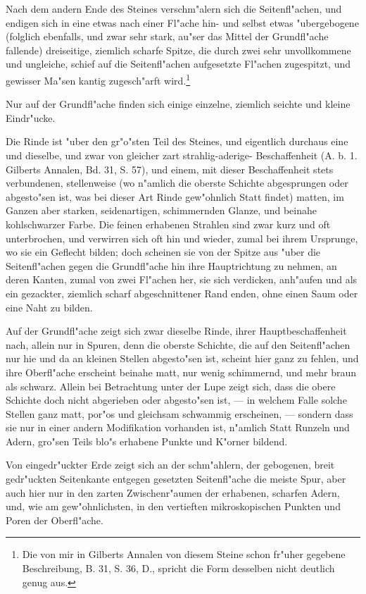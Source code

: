 \documentclass[a4paper, 11pt, oneside, german]{article}
\begin{document}
Nach dem andern Ende des Steines verschm"alern sich die Seitenfl"achen, und endigen sich in eine etwas nach einer Fl"ache hin- und selbst etwas "ubergebogene (folglich ebenfalls, und zwar sehr stark, au"ser das Mittel der Grundfl"ache fallende) dreiseitige, ziemlich scharfe Spitze, die durch zwei sehr unvollkommene und ungleiche, schief auf die Seitenfl"achen aufgesetzte Fl"achen zugespitzt, und gewisser Ma"sen kantig zugesch"arft wird.\footnote{Die von mir in Gilberts Annalen von diesem Steine schon fr"uher gegebene Beschreibung, B. 31, S. 36, D., spricht die Form desselben nicht deutlich genug aus.}

Nur auf der Grundfl"ache finden sich einige einzelne, ziemlich seichte und kleine Eindr"ucke.

Die Rinde ist "uber den gr"o"sten Teil des Steines, und eigentlich durchaus eine und dieselbe, und zwar von gleicher zart strahlig-aderige- Beschaffenheit (A. b. 1. Gilberts Annalen, Bd. 31, S. 57), und einem, mit dieser Beschaffenheit stets verbundenen, stellenweise (wo n"amlich die oberste Schichte abgesprungen oder abgesto"sen ist, was bei dieser Art Rinde gew"ohnlich Statt findet) matten, im Ganzen aber starken, seidenartigen, schimmernden Glanze, und beinahe kohlschwarzer Farbe. Die feinen erhabenen Strahlen sind zwar kurz und oft unterbrochen, und verwirren sich oft hin und wieder, zumal bei ihrem Ursprunge, wo sie ein Geflecht bilden; doch scheinen sie von der Spitze aus "uber die Seitenfl"achen gegen die Grundfl"ache hin ihre Hauptrichtung zu nehmen, an deren Kanten, zumal von zwei Fl"achen her, sie sich verdicken, anh"aufen und als ein gezackter, ziemlich scharf abgeschnittener Rand enden, ohne einen Saum oder eine Naht zu bilden.

Auf der Grundfl"ache zeigt sich zwar dieselbe Rinde, ihrer Hauptbeschaffenheit nach, allein nur in Spuren, denn die oberste Schichte, die auf den Seitenfl"achen nur hie und da an kleinen Stellen abgesto"sen ist, scheint hier ganz zu fehlen, und ihre Oberfl"ache erscheint beinahe matt, nur wenig schimmernd, und mehr braun als schwarz. Allein bei Betrachtung unter der Lupe zeigt sich, dass die obere Schichte doch nicht abgerieben oder abgesto"sen ist, --- in welchem Falle solche Stellen ganz matt, por"os und gleichsam schwammig erscheinen, --- sondern dass sie nur in einer andern Modifikation vorhanden ist, n"amlich Statt Runzeln und Adern, gro"sen Teils blo"s erhabene Punkte und K"orner bildend.

Von eingedr"uckter Erde zeigt sich an der schm"ahlern, der gebogenen, breit gedr"uckten Seitenkante entgegen gesetzten Seitenfl"ache die meiste Spur, aber auch hier nur in den zarten Zwischenr"aumen der erhabenen, scharfen Adern, und, wie am gew"ohnlichsten, in den vertieften mikroskopischen Punkten und Poren der Oberfl"ache.
\end{document}
